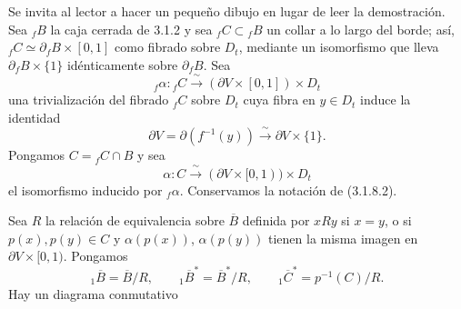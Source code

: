 Se invita al lector a hacer un pequeño dibujo en lugar de leer la
demostración. Sea ${}_fB$ la caja cerrada de 3.1.2 y sea
${}_fC\subset{}_fB$ un collar a lo largo del borde; así,
${}_fC\simeq\partial_fB\times[0,1]$ como fibrado sobre $D_t$, mediante
un isomorfismo que lleva $\partial_fB\times\{1\}$ idénticamente sobre
$\partial_fB$. Sea
\[
{}_f\alpha:{}_fC\xrightarrow{\ \sim\ }
(\partial V\times[0,1])\times D_t
\]
una trivialización del fibrado ${}_fC$ sobre $D_t$ cuya fibra en
$y\in D_t$ induce la identidad
\[
\partial V=\partial(f^{-1}(y))
\xrightarrow{\ \sim\ }\partial V\times\{1\}.
\]
Pongamos $C={}_fC\cap B$ y sea
\[
\alpha:C\xrightarrow{\ \sim\ }
(\partial V\times[0,1))\times D_t
\]
el isomorfismo inducido por ${}_f\alpha$. Conservamos la notación de
(3.1.8.2).

Sea $R$ la relación de equivalencia sobre $\overline B$ definida por
$xRy$ si $x=y$, o si $p(x),p(y)\in C$ y $\alpha(p(x))$,
$\alpha(p(y))$ tienen la misma imagen en $\partial V\times[0,1)$.
Pongamos
\[
{}_1\overline B=\overline B/R,
\qquad
{}_1\overline B^*=\overline B^*/R,
\qquad
{}_1\overline C^*=p^{-1}(C)/R.
\]
Hay un diagrama conmutativo

\pageoriginale


